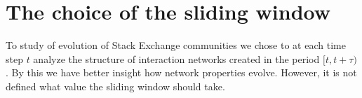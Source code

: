 \chapter{The choice of the sliding window} %

To study of evolution of Stack Exchange communities we chose to at each time step $t$ analyze the structure of interaction networks created in the period $[t, t+\tau)$. By this we have better insight how network properties evolve. However, it is not defined what value the sliding window should take. 





